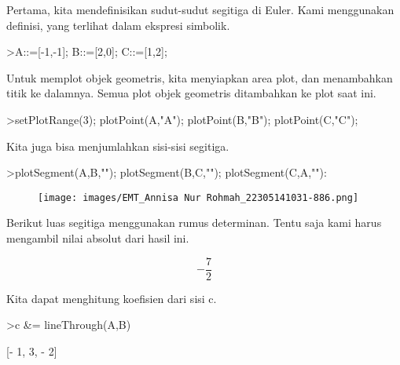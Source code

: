 \documentclass[a4paper,10pt]{article}
\begin{document}
\begin{eulernotebook}
\begin{eulercomment}
\begin{eulercomment}
\begin{eulercomment}
\begin{eulercomment}
\begin{eulercomment}
Pertama, kita mendefinisikan sudut-sudut segitiga di Euler. Kami
menggunakan definisi, yang terlihat dalam ekspresi simbolik.
\end{eulercomment}
\begin{eulerprompt}
>A::=[-1,-1]; B::=[2,0]; C::=[1,2];
\end{eulerprompt}
\begin{eulercomment}
Untuk memplot objek geometris, kita menyiapkan area plot, dan
menambahkan titik ke dalamnya. Semua plot objek geometris ditambahkan
ke plot saat ini.
\end{eulercomment}
\begin{eulerprompt}
>setPlotRange(3); plotPoint(A,"A"); plotPoint(B,"B"); plotPoint(C,"C");
\end{eulerprompt}
\begin{eulercomment}
Kita juga bisa menjumlahkan sisi-sisi segitiga.
\end{eulercomment}
\begin{eulerprompt}
>plotSegment(A,B,""); plotSegment(B,C,""); plotSegment(C,A,""):
\end{eulerprompt}
\begin{figure}[h]
    \centering
    \texttt{[image: images/EMT\_Annisa Nur Rohmah\_22305141031-886.png]}
\end{figure}
\begin{eulercomment}
Berikut luas segitiga menggunakan rumus determinan. Tentu saja kami
harus mengambil nilai absolut dari hasil ini.
\end{eulercomment}
\begin{eulerformula}
\[
-\frac{7}{2}
\]
\end{eulerformula}
\begin{eulercomment}
Kita dapat menghitung koefisien dari sisi c.
\end{eulercomment}
\begin{eulerprompt}
>c &= lineThrough(A,B)
\end{eulerprompt}
\begin{euleroutput}
  
                              [- 1, 3, - 2]
  

\end{euleroutput}
\end{eulercomment}
\end{eulercomment}
\end{eulercomment}
\end{eulercomment}
\end{eulernotebook}
\end{document}

